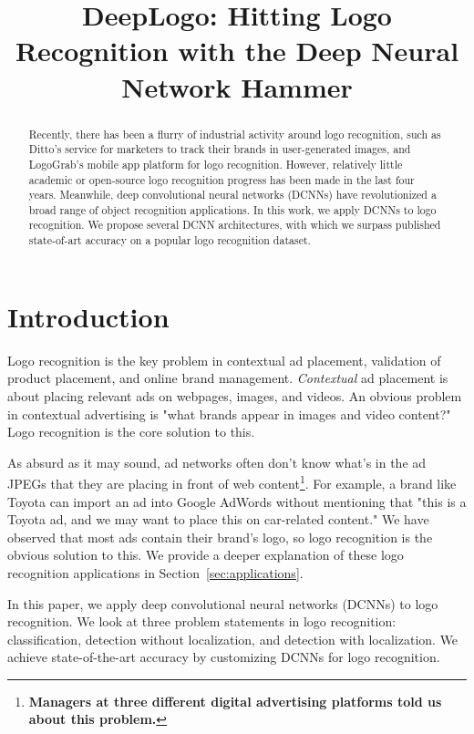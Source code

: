 \documentclass{bmvc2k}
\title{DeepLogo: Hitting Logo Recognition with the Deep Neural Network Hammer}
\begin{document}
\maketitle
\vspace{-0.2in}
\begin{abstract}
Recently, there has been a flurry of industrial activity around logo recognition, such as Ditto's service for marketers to track their brands in user-generated images, and LogoGrab's mobile app platform for logo recognition.
However, relatively little academic or open-source logo recognition progress has been made in the last four years.
Meanwhile, deep convolutional neural networks (DCNNs) have revolutionized a broad range of object recognition applications.
In this work, we apply DCNNs to logo recognition.
We propose several DCNN architectures, with which we surpass published state-of-art accuracy on a popular logo recognition dataset.
\end{abstract}
\vspace{-0.1in}

\section{Introduction}
\vspace{-0.1in}
\label{sec:intro}

Logo recognition is the key problem in contextual ad placement, validation of product placement, and online brand management.
{\em Contextual} ad placement is about placing relevant ads on webpages, images, and videos.
An obvious problem in contextual advertising is "what brands appear in images and video content?" 
Logo recognition is the core solution to this.

As absurd as it may sound, ad networks often don't know what's in the ad JPEGs that they are placing in front of web content\footnote{\bf Managers at three different digital advertising platforms told us about this problem.}.
For example, a brand like Toyota can import an ad into Google AdWords without mentioning that "this is a Toyota ad, and we may want to place this on car-related content."
We have observed that most ads contain their brand's logo, so logo recognition is the obvious solution to this.
We provide a deeper explanation of these logo recognition applications in Section~\ref{sec:applications}.

In this paper, we apply deep convolutional neural networks (DCNNs) to logo recognition.
We look at three problem statements in logo recognition: classification, detection without localization, and detection with localization.
We achieve state-of-the-art accuracy by customizing DCNNs for logo recognition.
\end{document}
